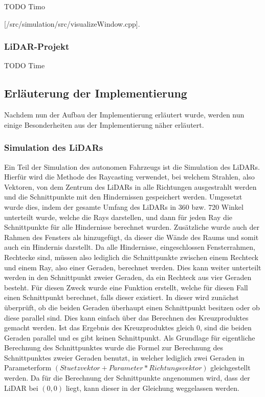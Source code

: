 TODO Timo

[/src/simulation/src/visualizeWindow.cpp]. 

\subsubsection{LiDAR-Projekt}

TODO Time

\subsection{Erläuterung der Implementierung}

Nachdem nun der Aufbau der Implementierung erläutert wurde, werden nun einige Besonderheiten aus der Implementierung näher erläutert. 

\subsubsection{Simulation des LiDARs}

Ein Teil der Simulation des autonomen Fahrzeugs ist die Simulation des LiDARs. Hierfür wird die Methode des Raycasting verwendet, bei welchem Strahlen, also Vektoren, von dem Zentrum des LiDARs in alle Richtungen ausgestrahlt werden und die Schnittpunkte mit den Hindernissen gespeichert werden. Umgesetzt wurde dies, indem der gesamte Umfang des LiDARs in 360 bzw. 720 Winkel unterteilt wurde, welche die Rays darstellen, und dann für jeden Ray die Schnittpunkte für alle Hindernisse berechnet wurden. Zusätzliche wurde auch der Rahmen des Fensters als hinzugefügt, da dieser die Wände des Raums und somit auch ein Hindernis darstellt. Da alle Hindernisse, eingeschlossen Fensterrahmen, Rechtecke sind, müssen also lediglich die Schnittpunkte zwischen einem Rechteck und einem Ray, also einer Geraden, berechnet werden. Dies kann weiter unterteilt werden in den Schnittpunkt zweier Geraden, da ein Rechteck aus vier Geraden besteht. Für diesen Zweck wurde eine Funktion erstellt, welche für diesen Fall einen Schnittpunkt berechnet, falls dieser existiert. In dieser wird zunächst überprüft, ob die beiden Geraden überhaupt einen Schnittpunkt besitzen oder ob diese parallel sind. Dies kann einfach über das Berechnen des Kreuzproduktes gemacht werden. Ist das Ergebnis des Kreuzproduktes gleich \(0\), sind die beiden Geraden parallel und es gibt keinen Schnittpunkt. Als Grundlage für eigentliche Berechnung des Schnittpunktes wurde die Formel zur Berechnung des Schnittpunktes zweier Geraden benutzt, in welcher lediglich zwei Geraden in Parameterform \((Stuetzvektor + Parameter * Richtungsvektor)\) gleichgestellt werden. Da für die Berechnung der Schnittpunkte angenommen wird, dass der LiDAR bei \((0, 0)\) liegt, kann dieser in der Gleichung weggelassen werden. 

